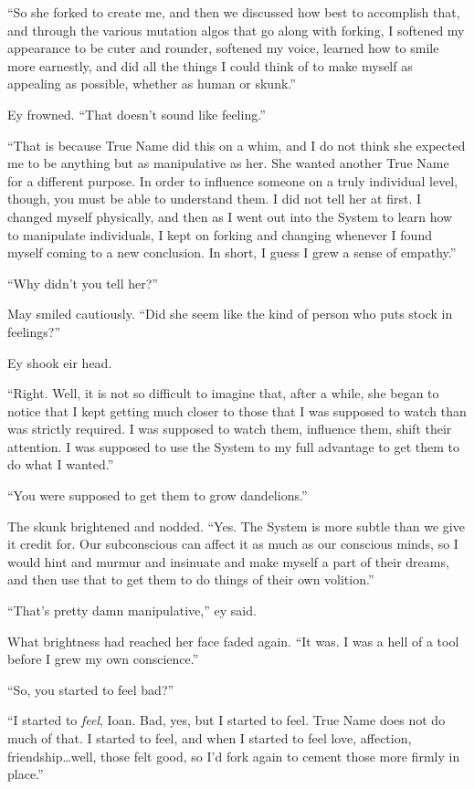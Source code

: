 ``So she forked to create me, and then we discussed how best to accomplish that, and through the various mutation algos that go along with forking, I softened my appearance to be cuter and rounder, softened my voice, learned how to smile more earnestly, and did all the things I could think of to make myself as appealing as possible, whether as human or skunk.''

Ey frowned. ``That doesn't sound like feeling.''

``That is because True Name did this on a whim, and I do not think she expected me to be anything but as manipulative as her. She wanted another True Name for a different purpose. In order to influence someone on a truly individual level, though, you must be able to understand them. I did not tell her at first. I changed myself physically, and then as I went out into the System to learn how to manipulate individuals, I kept on forking and changing whenever I found myself coming to a new conclusion. In short, I guess I grew a sense of empathy.''

``Why didn't you tell her?''

May smiled cautiously. ``Did she seem like the kind of person who puts stock in feelings?''

Ey shook eir head.

``Right. Well, it is not so difficult to imagine that, after a while, she began to notice that I kept getting much closer to those that I was supposed to watch than was strictly required. I was supposed to watch them, influence them, shift their attention. I was supposed to use the System to my full advantage to get them to do what I wanted.''

``You were supposed to get them to grow dandelions.''

The skunk brightened and nodded. ``Yes. The System is more subtle than we give it credit for. Our subconscious can affect it as much as our conscious minds, so I would hint and murmur and insinuate and make myself a part of their dreams, and then use that to get them to do things of their own volition.''

``That's pretty damn manipulative,'' ey said.

What brightness had reached her face faded again. ``It was. I was a hell of a tool before I grew my own conscience.''

``So, you started to feel bad?''

``I started to \emph{feel}, Ioan. Bad, yes, but I started to feel. True Name does not do much of that. I started to feel, and when I started to feel love, affection, friendship\ldots well, those felt good, so I'd fork again to cement those more firmly in place.''

